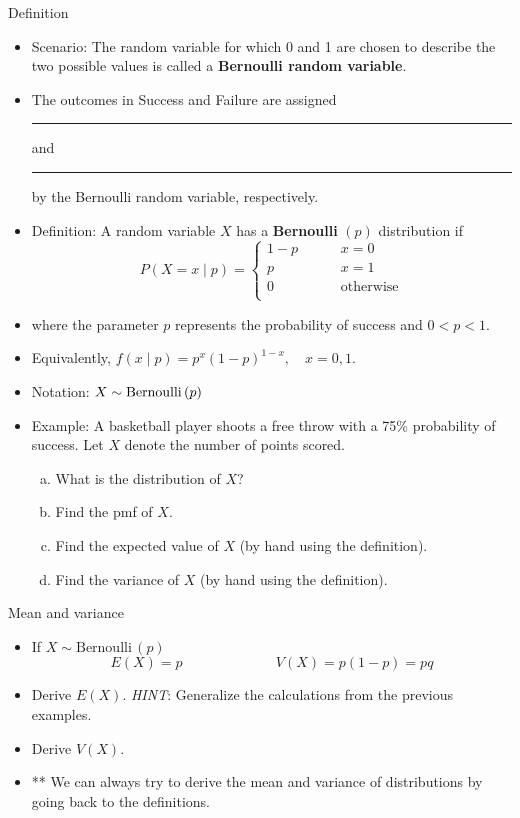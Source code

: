 \documentclass{article}
\newcommand{\blankul}[1]{\rule[-1.5mm]{#1}{0.15mm}}	%
\newcommand{\follow}[1]{\sim \text{#1}\,}		%
\begin{document}
Definition\bigskip
\begin{itemize}
    \item Scenario: The random variable for which 0 and 1 are chosen to describe the two possible values is called a \textbf{Bernoulli random variable}.
    \item The outcomes in Success and Failure are assigned \blankul{1cm} and \blankul{1cm} by the Bernoulli random variable, respectively.\vspace{80pt}
    \item Definition: A random variable $X$ has a \textbf{Bernoulli} $(p)$ distribution if
    \[
    P(X = x \mid p) =
        \left\{
        \begin{array}{ll}
            1 - p \hspace{15pt} & \quad x = 0\\
            p & \quad x = 1\\
            0 & \quad \text{otherwise}\\
        \end{array}
        \right.
    \]
    \item[] where the parameter $p$ represents the probability of success and $0 < p < 1$.
    \item[] Equivalently, $f(x \mid p) = p^x (1 - p)^{1 - x}, \quad x = 0,1$.\bigskip
    \item Notation: $X \follow{Bernoulli}(p)\bigskip$
    \item Example: A basketball player shoots a free throw with a 75\% probability of success. Let $X$ denote the number of points scored.
    \begin{enumerate}[(a)]
        \item What is the distribution of $X$?\vspace{30pt}
        \item Find the pmf of $X$.\vspace{35pt}
        \item Find the expected value of $X$ (by hand using the definition).\vspace{80pt}
        \item Find the variance of $X$ (by hand using the definition).\vspace{80pt}
    \end{enumerate}
\end{itemize}\bigskip

Mean and variance\bigskip
\begin{itemize}
    \item If $X \follow{Bernoulli}(p)$\smallskip
    \[E(X) = p \hspace{80pt} V(X) = p(1 - p) = pq\]
    \item Derive $E(X)$. \textit{HINT}: Generalize the calculations from the previous examples.\vspace{80pt}
    \item Derive $V(X)$.\vspace{170pt}
    \item[] ** We can always try to derive the mean and variance of distributions by going back to the definitions.
\end{itemize}\bigskip
\end{document}
